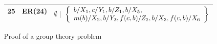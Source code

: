 \begin{figure}[htbp]
\begin{center}
\begin{tabular}{clc}
  25 & ER(24) &
  $ \clauseWithSubst{
      \emptyset
    }{ \left\{
      \begin{array}{l}
        \mapVar{X_1}b, \mapVar{Y_1}c, \mapVar{Z_1}b, \mapVar{X_5}b,  \\
        \mapVar{X_2}{m(b)}, \mapVar{Y_2}{b}, \mapVar{Z_2}{f(c,b)},
           \mapVar{X_3}{b}, \mapVar{X_6}{f(c,b)}
      \end{array} \right\}
    }$
  \\

  \bottomrule
\end{tabular}
\caption{Proof of a group theory problem}
\label{fig:unit-sup-proof-example}
\end{center}
\end{figure}


